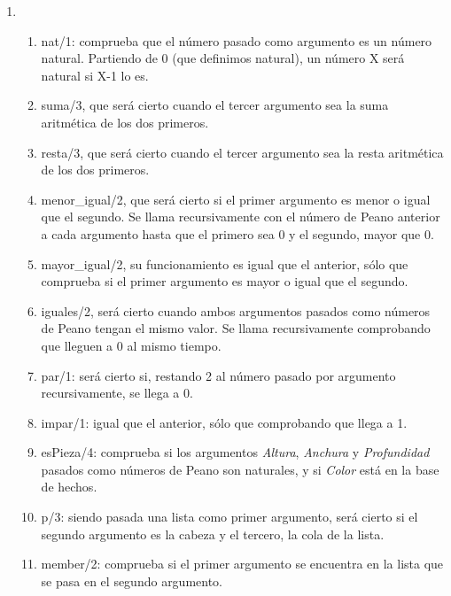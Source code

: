 \documentclass{article} %
\begin{document}
\begin{enumerate}
\item \begin{enumerate}
\item  nat/1: comprueba que el número pasado como argumento es un número natural. Partiendo de 0 (que definimos natural), un número X será natural si X-1 lo es.

\item  suma/3, que será cierto cuando el tercer argumento sea la suma aritmética de los dos primeros.

\item  resta/3, que será cierto cuando el tercer argumento sea la resta aritmética de los dos primeros.

\item  menor\_igual/2, que será cierto si el primer argumento es menor o igual que el segundo. Se llama recursivamente con el número de Peano anterior a cada argumento hasta que el primero sea 0 y el segundo, mayor que 0.

\item  mayor\_igual/2, su funcionamiento es igual que el anterior, sólo que comprueba si el primer argumento es mayor o igual que el segundo.

\item  iguales/2, será cierto cuando ambos argumentos pasados como números de Peano tengan el mismo valor. Se llama recursivamente comprobando que lleguen a 0 al mismo tiempo.

\item  par/1: será cierto si, restando 2 al número pasado por argumento recursivamente, se llega a 0.

\item  impar/1: igual que el anterior, sólo que comprobando que llega a 1.

\item  esPieza/4: comprueba si los argumentos \textit{Altura}, \textit{Anchura} y \textit{Profundidad} pasados como números de Peano son naturales, y si \textit{Color} está en la base de hechos.

\item  p/3: siendo pasada una lista como primer argumento, será cierto si el segundo argumento es la cabeza y el tercero, la cola de la lista.

\item  member/2: comprueba si el primer argumento se encuentra en la lista que se pasa en el segundo argumento.
\end{enumerate}
\end{enumerate}
\end{document}
